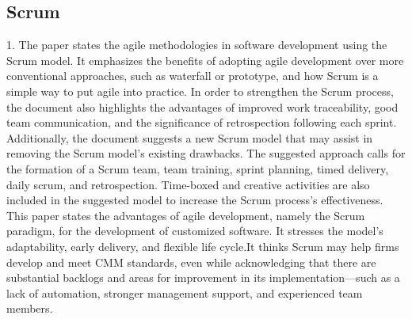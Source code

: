\documentclass[conference]{IEEEtran}
\begin{document}
\subsection{Scrum}
1. The paper \cite{scrump1} states the agile methodologies  in software development using the Scrum model. It emphasizes the benefits of adopting agile development over more conventional approaches, such as waterfall or prototype, and how Scrum is a simple way to put agile into practice. In order to strengthen the Scrum process, the document also highlights the advantages of improved work traceability, good team communication, and the significance of retrospection following each sprint. Additionally, the document suggests a new Scrum model that may assist in removing the Scrum model's existing drawbacks. The suggested approach calls for the formation of a Scrum team, team training, sprint planning, timed delivery, daily scrum, and retrospection. Time-boxed and creative activities are also included in the suggested model to increase the Scrum process's effectiveness.
This paper states the advantages of agile development, namely the Scrum paradigm, for the development of customized software. It stresses the model's adaptability, early delivery, and flexible life cycle.It thinks Scrum may help firms develop and meet CMM standards, even while acknowledging that there are substantial backlogs and areas for improvement in its implementation—such as a lack of automation, stronger management support, and experienced team members.
\newline
\newline
\end{document}
